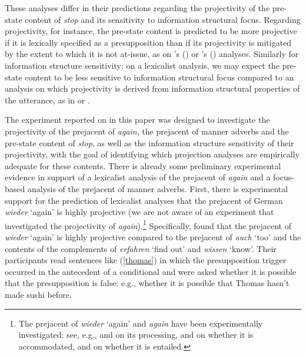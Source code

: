\documentclass[a4paper,12pt]{article}
\newcommand{\6}{\mbox{$[\hspace*{-.6mm}[$}}
\newcommand{\9}{\mbox{$]\hspace*{-.6mm}]$}}
\newcommand{\citetpos}[1]{\citeauthor{#1}'s (\citeyear{#1})}
\begin{document}
These analyses differ in their predictions regarding the projectivity of the pre-state content of {\em stop} and its sensitivity to information structural focus. Regarding projectivity, for instance, the pre-state content is predicted to be more projective if it is lexically specified as a presupposition than if its projectivity is mitigated by the extent to which it is not at-issue, as on \citetpos{abrusan2016} or \citetpos{brst-ar} analyses. Similarly for information structure sensitivity: on a lexicalist analysis, we may expect the pre-state content to be less sensitive to information structural focus compared to an analysis on which projectivity is derived from information structural properties of the utterance, as in \citealt{abrusan2016} or \citealt{brst-ar}. 

The experiment reported on in this paper was designed to investigate the projectivity of the prejacent of {\em again}, the prejacent of manner adverbs and the pre-state content of {\em stop}, as well as the information structure sensitivity of their projectivity, with the goal of identifying which projection analyses are empirically adequate for these contents. There is already some preliminary experimental evidence in support of a lexicalist analysis of the prejacent of {\em again} and a focus-based analysis of the prejacent of manner adverbs. First, there is experimental support for the prediction of lexicalist analyses that the prejacent of German {\em wieder} `again' is highly projective (we are not aware of an experiment that investigated the projectivity of {\em again}).\footnote{The prejacent of  {\em wieder} `again' and {\em again} have been experimentally investigated: see, e.g., \citealt{schwarz-tiemann2012} and \citealt{jouravlev-etal2016} on its processing,  \citealt{tiemann-thesis,tiemann-etal2015} and \citet{bacovcin-etal2018} on whether it is accommodated, and \citealt{zehr-schwarz2018} on whether it is entailed.} Specifically, \citet{xue-onea11} found that the prejacent of {\em wieder} `again' is highly projective compared to the prejacent of {\em auch} `too' and the contents of the complements of {\em erfahren} `find out' and {\em wissen} `know'. Their participants read sentences like (\ref{thomas}) in which the presupposition trigger occurred in the antecedent of a conditional and were asked whether it is possible that the presupposition is false: e.g., whether it is possible that Thomas hasn't made sushi before.
\end{document}
